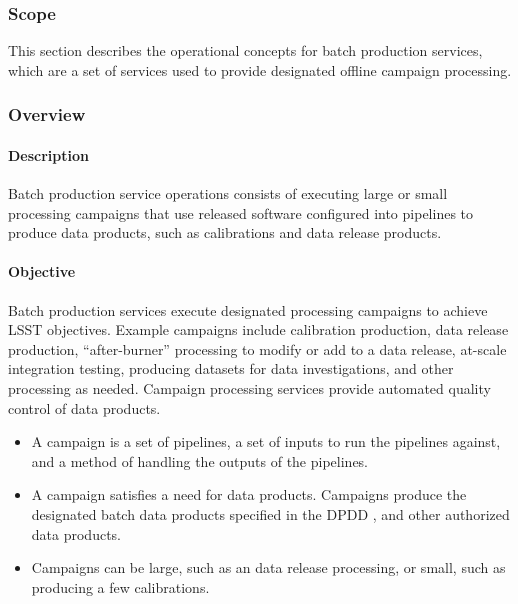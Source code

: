 \subsubsection{Scope}

This section describes the operational concepts for batch production services,
which are a set of services used to provide designated offline campaign
processing.

\subsubsection{Overview}

\paragraph{Description}
Batch production service operations consists of executing large or small processing
campaigns that use released software configured into pipelines to produce data products,
such as calibrations and data release products.

\paragraph{Objective}
Batch production services execute designated processing campaigns to achieve
LSST objectives. Example campaigns include calibration production, data release
production, ``after-burner'' processing to modify or add to a data release,
at-scale integration testing, producing datasets for data investigations, and
other processing as needed. Campaign processing services provide automated quality control
of data products.

\begin{itemize}

\item A campaign is a set of pipelines, a set of inputs to run the pipelines
against, and a method of handling the outputs of the pipelines.

\item A campaign satisfies a need for data products. Campaigns produce the
designated batch data products specified in the DPDD , and
other authorized data products.

\item Campaigns can be large, such as an data release processing, or small,
such as producing a few calibrations.

\end{itemize}

